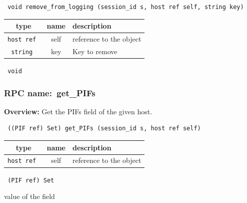 \begin{verbatim} void remove_from_logging (session_id s, host ref self, string key)\end{verbatim}



 
\vspace{0.3cm}
\begin{tabular}{|c|c|p{7cm}|}
 \hline
{\bf type} & {\bf name} & {\bf description} \\ \hline
{\tt host ref } & self & reference to the object \\ \hline 

{\tt string } & key & Key to remove \\ \hline 

\end{tabular}

\vspace{0.3cm}

{\tt 
void
}



\vspace{0.3cm}
\vspace{0.3cm}
\vspace{0.3cm}
\subsubsection{RPC name:~get\_PIFs}

{\bf Overview:} 
Get the PIFs field of the given host.

\begin{verbatim} ((PIF ref) Set) get_PIFs (session_id s, host ref self)\end{verbatim}



 
\vspace{0.3cm}
\begin{tabular}{|c|c|p{7cm}|}
 \hline
{\bf type} & {\bf name} & {\bf description} \\ \hline
{\tt host ref } & self & reference to the object \\ \hline 

\end{tabular}

\vspace{0.3cm}

{\tt 
(PIF ref) Set
}


value of the field
\vspace{0.3cm}
\vspace{0.3cm}
\vspace{0.3cm}
